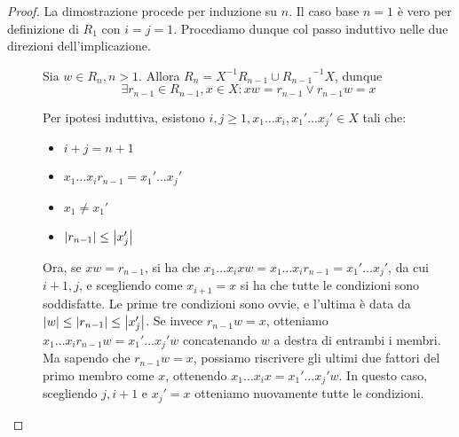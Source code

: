 \begin{proof}
  La dimostrazione procede per induzione su \(n\).
  Il caso base \(n=1\) è vero per definizione di \(R_1\) con \(i = j = 1\).
  Procediamo dunque col passo induttivo nelle due direzioni dell'implicazione.
  \begin{description}
    \item[\q{\(\implies\)}] 
      Sia \(w \in R_n, n>1\). Allora \(R_n = X^{-1}R_{n-1} \cup {R_{n-1}}^{-1}X\), dunque
      \[\exists r_{n-1} \in R_{n-1}, x \in X: xw=r_{n-1} \lor r_{n-1}w=x\]

      Per ipotesi induttiva, esistono \(i,j \geq 1, x_1\ldots x_i,x_1'\ldots x_j' \in X\) tali che:
      \begin{itemize}
        \item \(i+j=n+1\)
        \item \(x_1\ldots x_i r_{n-1} = x_1'\ldots x_j'\)
        \item \(x_1 \neq x_1'\)
        \item \(\left|r_{n-1}\right| \leq \left|x_j'\right|\)
      \end{itemize}
      Ora, se \(xw = r_{n-1}\), si ha che \(x_1\ldots x_i xw= x_1\ldots x_i r_{n-1} = x_1'\ldots x_j'\), da cui \(i+1,j\), e scegliendo come \(x_{i+1} = x\) si ha che tutte le condizioni sono soddisfatte.
      Le prime tre condizioni sono ovvie, e l'ultima è data da \(\left|w\right|\leq\left|r_{n-1}\right|\leq\left|x_j'\right|\).
      Se invece \(r_{n-1}w = x\), otteniamo \(x_1\ldots x_i r_{n-1} w = x_1'\ldots x_j' w\) concatenando \(w\) a destra di entrambi i membri.
      Ma sapendo che \(r_{n-1}w = x\), possiamo riscrivere gli ultimi due fattori del primo membro come \(x\), ottenendo \(x_1\ldots x_i x = x_1'\ldots x_j' w\).
      In questo caso, scegliendo \(j,i+1\) e \(x_j' = x\) otteniamo nuovamente tutte le condizioni.
    \item[\q{\(\impliedby\)}]
  \end{description}
\end{proof}